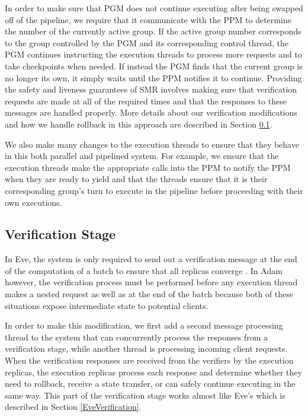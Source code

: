 \documentclass[11pt, oneside]{report}
\begin{document}
In order to make sure that PGM does not continue executing after being swapped off of the pipeline, we require that it communicate with the PPM to determine the number of the currently active group. 
If the active group number corresponds to the group controlled by the PGM and its corresponding control thread, the PGM continues instructing the execution threads to process more requests and to take checkpoints when needed. 
If instead the PGM finds that the current group is no longer its own, it simply waits until the PPM notifies it to continue.
Providing the safety and liveness guarantees of SMR involves making sure that verification requests are made at all of the required times and that the responses to these messages are handled properly. 
More details about our verification modifications and how we handle rollback in this approach are described in Section \ref{Verification}. 

We also make many changes to the execution threads to ensure that they behave in this both parallel and pipelined system.
For example, we ensure that the execution threads make the appropriate calls into the PPM to notify the PPM when they are ready to yield and that the threads ensure that it is their corresponding group's turn to execute in the pipeline before proceeding with their own executions.

\subsection{Verification Stage}\label{Verification}

In Eve, the system is only required to send out a verification message at the end of the computation of a batch to ensure that all replicas converge \cite{eve}.
In Adam however, the verification process must be performed before any execution thread makes a nested request as well as at the end of the batch because both of these situations expose intermediate state to potential clients.


In order to make this modification, we first add a second message processing thread to the system that can concurrently process the responses from a verification stage, while another thread is processing incoming client requests.
When the verification responses are received from the verifiers by the execution replicas, the execution replicas process each response and determine whether they need to rollback, receive a state transfer, or can safely continue executing in the same way. 
This part of the verification stage works almost like Eve's which is described in Section \ref{EveVerification}.
\end{document}
